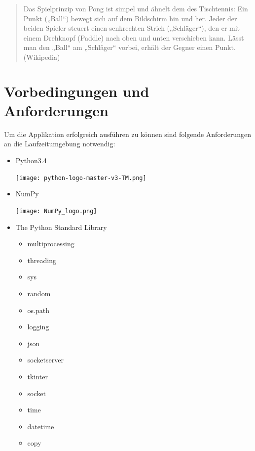 \documentclass[12pt,twoside]{article}
\theoremstyle{plain}
\theoremstyle{definition}
\theoremstyle{remark}
\begin{document}
\begin{quote}
Das Spielprinzip von Pong ist simpel und ähnelt dem des Tischtennis: Ein Punkt („Ball“) bewegt sich auf dem Bildschirm hin und her. Jeder der beiden Spieler steuert einen senkrechten Strich („Schläger“), den er mit einem Drehknopf (Paddle) nach oben und unten verschieben kann. Lässt man den „Ball“ am „Schläger“ vorbei, erhält der Gegner einen Punkt. 
(Wikipedia)
\end{quote}




\setcounter{tocdepth}{2} 					%
\tableofcontents
{}

\newpage




\section{Vorbedingungen und Anforderungen}

Um die Applikation erfolgreich ausführen zu können sind folgende Anforderungen an die Laufzeitumgebung notwendig:


\begin{itemize}
\item Python3.4
\begin{centering}
\texttt{[image: python-logo-master-v3-TM.png]}
\end{centering}
\item NumPy
\begin{centering}
\texttt{[image: NumPy\_logo.png]}
\end{centering}
\item The Python Standard Library 
\begin{itemize}
 \item multiprocessing
 \item threading
 \item sys
 \item random
 \item os.path
 \item logging
 \item json
 \item socketserver
 \item tkinter
 \item socket
 \item time
 \item datetime
 \item copy
\end{itemize} 

\end{itemize} 
 
\end{document}
